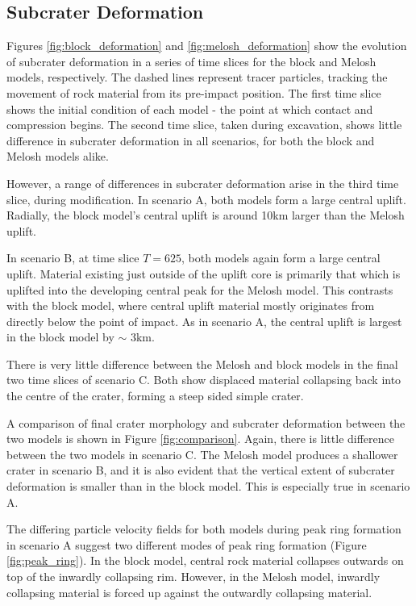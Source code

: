 \subsection{Subcrater Deformation \label{subsec:comparison}}

Figures \ref{fig:block_deformation} and \ref{fig:melosh_deformation} show the evolution of subcrater deformation in a series of time slices for the block and Melosh models, respectively. The dashed lines represent tracer particles, tracking the movement of rock material from its pre-impact position. The first time slice shows the initial condition of each model - the point at which contact and compression begins. The second time slice, taken during excavation, shows little difference in subcrater deformation in all scenarios, for both the block and Melosh models alike.

However, a range of differences in subcrater deformation arise in the third time slice, during modification. In scenario A, both models form a large central uplift. Radially, the block model's central uplift is around 10km larger than the Melosh uplift.

In scenario B, at time slice $T=625$, both models again form a large central uplift. Material existing just outside of the uplift core is primarily that which is uplifted into the developing central peak for the Melosh model. This contrasts with the block model, where central uplift material mostly originates from directly below the point of impact. As in scenario A, the central uplift is largest in the block model by $\sim$ 3km.

There is very little difference between the Melosh and block models in the final two time slices of scenario C. Both show displaced material collapsing back into the centre of the crater, forming a steep sided simple crater. 

A comparison of final crater morphology and subcrater deformation between the two models is shown in Figure \ref{fig:comparison}. Again, there is little difference between the two models in scenario C. The Melosh model produces a shallower crater in scenario B, and it is also evident that the vertical extent of subcrater deformation is smaller  than in the block model. This is especially true in scenario A.

The differing particle velocity fields for both models during peak ring formation in scenario A suggest two different modes of peak ring formation (Figure \ref{fig:peak_ring}). In the block model, central rock material collapses outwards on top of the inwardly collapsing rim. However, in the Melosh model, inwardly collapsing material is forced up against the outwardly collapsing material.
